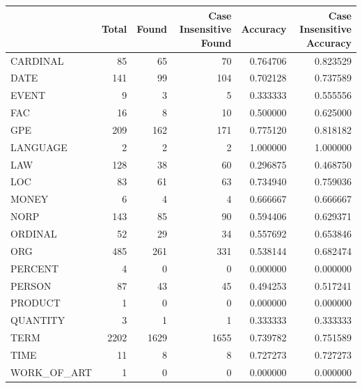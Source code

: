 \begin{tabular}{lrrrrr}
\toprule
 & Total & Found & Case Insensitive Found & Accuracy & Case Insensitive Accuracy \\
\midrule
CARDINAL & 85 & 65 & 70 & 0.764706 & 0.823529 \\
DATE & 141 & 99 & 104 & 0.702128 & 0.737589 \\
EVENT & 9 & 3 & 5 & 0.333333 & 0.555556 \\
FAC & 16 & 8 & 10 & 0.500000 & 0.625000 \\
GPE & 209 & 162 & 171 & 0.775120 & 0.818182 \\
LANGUAGE & 2 & 2 & 2 & 1.000000 & 1.000000 \\
LAW & 128 & 38 & 60 & 0.296875 & 0.468750 \\
LOC & 83 & 61 & 63 & 0.734940 & 0.759036 \\
MONEY & 6 & 4 & 4 & 0.666667 & 0.666667 \\
NORP & 143 & 85 & 90 & 0.594406 & 0.629371 \\
ORDINAL & 52 & 29 & 34 & 0.557692 & 0.653846 \\
ORG & 485 & 261 & 331 & 0.538144 & 0.682474 \\
PERCENT & 4 & 0 & 0 & 0.000000 & 0.000000 \\
PERSON & 87 & 43 & 45 & 0.494253 & 0.517241 \\
PRODUCT & 1 & 0 & 0 & 0.000000 & 0.000000 \\
QUANTITY & 3 & 1 & 1 & 0.333333 & 0.333333 \\
TERM & 2202 & 1629 & 1655 & 0.739782 & 0.751589 \\
TIME & 11 & 8 & 8 & 0.727273 & 0.727273 \\
WORK_OF_ART & 1 & 0 & 0 & 0.000000 & 0.000000 \\
\bottomrule
\end{tabular}
